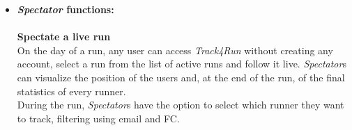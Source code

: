 \documentclass[titlepage]{article}
\begin{document}
\begin{itemize}
{\bf Organize new runs} \\
{\it Track4Run} gives organizers, using a {\it Third Party} account, the possibility to create a run and get data from participants. When creating a run, organizers have to define the path that the run will follow on a map, set the starting time and ending time of the event and the maximum number of participants. When a run is full no more runners can join it.\\
Throughout the event, organizers have access to live data of all participants, and can save that data after the event has finished.\\

	\item{\bf {\it Spectator} functions: }\\
	\\
	{\bf Spectate a live run} \\
	On the day of a run, any user can access {\it Track4Run} without creating any account, select a run from the list of active runs and follow it live. {\it Spectator}s can visualize the position of the users and, at the end of the run, of the final statistics of every runner.\\
During the run, {\it Spectator}s have the option to select which runner they want to track, filtering using email and FC.\\
	\end{itemize}
	
\end{document}
